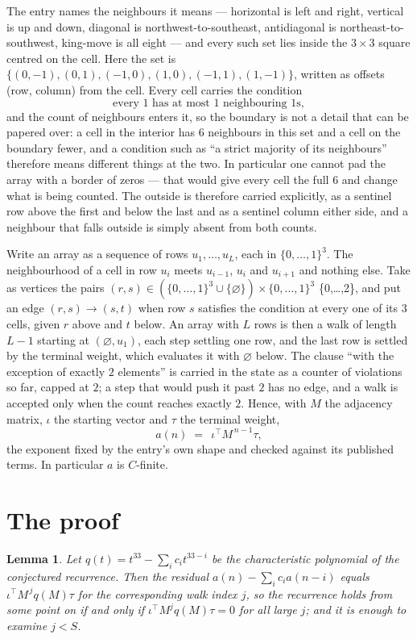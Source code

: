 \documentclass[11pt,a4paper]{article}
\theoremstyle{plain}
\newtheorem{lemma}[theorem]{Lemma}
\theoremstyle{definition}
\begin{document}
The entry names the neighbours it means --- horizontal is left and right, vertical is up and
down, diagonal is northwest-to-southeast, antidiagonal is northeast-to-southwest, king-move is
all eight --- and every such set lies inside the $3\times3$ square centred on the cell. Here
the set is $\{(0,-1), (0,1), (-1,0), (1,0), (-1,1), (1,-1)\}$, written as offsets (row, column) from the cell. Every cell carries
the condition
\[
\text{every 1 has at most 1 neighbouring 1s},
\]
and the count of neighbours enters it, so the boundary is not a detail that can be papered
over: a cell in the interior has $6$ neighbours in this set and a cell on the boundary
fewer, and a condition such as ``a strict majority of its neighbours'' therefore means
different things at the two. In particular one cannot pad the array with a border of zeros ---
that would give every cell the full $6$ and change what is being counted. The outside is
therefore carried
explicitly, as a sentinel row above the first and below the last and as a sentinel column
either side, and a neighbour that falls outside is simply absent from both counts.

Write an array as a sequence of rows $u_1,\dots,u_L$, each in
$\{0,\dots,1\}^{3}$. The neighbourhood of a cell in row $u_i$ meets $u_{i-1}$,
$u_i$ and $u_{i+1}$ and nothing else. Take as vertices the pairs
$(r,s)\in(\{0,\dots,1\}^{3}\cup\{\varnothing\})\times\{0,\dots,1\}^{3}$ \times \{0,\dots,2\},
and put an edge $(r,s)\to(s,t)$ when row $s$ satisfies the condition at every one of its
$3$ cells, given $r$ above and $t$ below. An array with $L$ rows is then a walk of length
$L-1$ starting at $(\varnothing,u_1)$, each step settling one row, and the last row is
settled by the terminal weight, which evaluates it with $\varnothing$ below. The clause ``with the exception of exactly $2$ elements'' is carried in
the state as a counter of violations so far, capped at $2$; a step that would push it past
$2$ has no edge, and a walk is accepted only when the count reaches exactly $2$. Hence,
with $M$ the adjacency matrix, $\iota$ the starting vector and $\tau$ the terminal weight,
\[
a(n)\;=\;\,\iota^{\!\top}M^{\,n-1}\tau ,
\]
the exponent fixed by the entry's own shape and checked against its published terms. In
particular $a$ is $C$-finite.

\section{The proof}

\begin{lemma}\label{lem:crit}
Let $q(t)=t^{33}-\sum_i c_it^{33-i}$ be the characteristic polynomial of the
conjectured recurrence. Then the residual $a(n)-\sum_ic_ia(n-i)$ equals
$\iota^{\!\top}M^{\,j}q(M)\tau$ for the corresponding walk index $j$, so the
recurrence holds from some point on if and only if $\iota^{\!\top}M^{j}q(M)\tau=0$ for all
large $j$; and it is enough to examine $j<S$.
\end{lemma}
\end{document}
